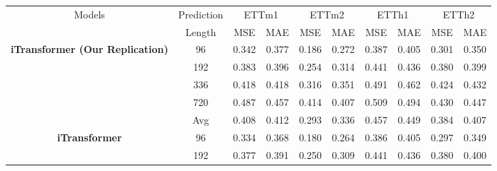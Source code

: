 \documentclass[twoside,12pt]{article}
\begin{document}
\begin{table}[htbp]
{\begin{small}
      \begin{tabular}{c|c|cc|cc|cc|cc}
        \toprule
        \multirow{2}{*}{Models}                                  & Prediction & \multicolumn{2}{c|}{ETTm1} & \multicolumn{2}{c|}{ETTm2} & \multicolumn{2}{c|}{ETTh1} & \multicolumn{2}{c|}{ETTh2}                                 \\
        \cmidrule(lr){3-4} \cmidrule(lr){5-6} \cmidrule(lr){7-8} \cmidrule(lr){9-10}
                                                                 & Length     & MSE                        & MAE                        & MSE                        & MAE                        & MSE   & MAE   & MSE   & MAE   \\
        \midrule
        \multirow{5}{*}{\textbf{iTransformer (Our Replication)}} & 96         & 0.342                      & 0.377                      & 0.186                      & 0.272                      & 0.387 & 0.405 & 0.301 & 0.350 \\
                                                                 & 192        & 0.383                      & 0.396                      & 0.254                      & 0.314                      & 0.441 & 0.436 & 0.380 & 0.399 \\
                                                                 & 336        & 0.418                      & 0.418                      & 0.316                      & 0.351                      & 0.491 & 0.462 & 0.424 & 0.432 \\
                                                                 & 720        & 0.487                      & 0.457                      & 0.414                      & 0.407                      & 0.509 & 0.494 & 0.430 & 0.447 \\
        \cmidrule(lr){2-10}
                                                                 & Avg        & 0.408                      & 0.412                      & 0.293                      & 0.336                      & 0.457 & 0.449 & 0.384 & 0.407 \\
        \midrule
        \multirow{5}{*}{\textbf{iTransformer}}                   & 96         & 0.334                      & 0.368                      & 0.180                      & 0.264                      & 0.386 & 0.405 & 0.297 & 0.349 \\
                                                                 & 192        & 0.377                      & 0.391                      & 0.250                      & 0.309                      & 0.441 & 0.436 & 0.380 & 0.400 \\

\end{tabular}
\end{small}}
\end{table}
\end{document}
